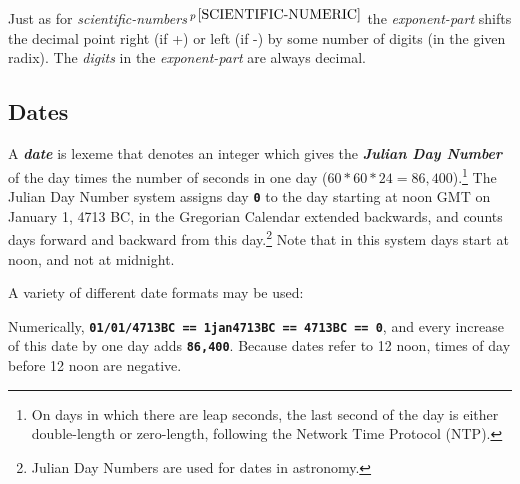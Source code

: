 \documentclass[12pt]{article}
\newcommand{\TT}[1]{{\tt \bfseries #1}}
\newcommand{\key}[1]{{\bf \em #1}\index{#1}}
\newcommand{\pagnote}[1]{$\,^{p\,\pageref{#1}}$}
\begin{document}
Just as for {\em scientific-numbers}\pagnote{SCIENTIFIC-NUMERIC}
the {\em exponent-part} shifts the decimal point right (if +) or left (if -)
by some number of digits (in the given radix).  The {\em digits}
in the {\em exponent-part} are always decimal.


\subsection{Dates}
\label{DATES}

A \key{date} is lexeme that denotes an integer
which gives the \key{Julian Day Number} of the day times
the number of seconds in one day ($60*60*24=86,400$).\footnote{
On days in which there are leap seconds, the last second of the
day is either double-length or zero-length, following the Network
Time Protocol (NTP).}
The Julian Day Number system assigns day \TT{0} to the day starting
at noon GMT on January 1, 4713 BC, in the Gregorian Calendar extended
backwards, and counts days forward and backward
from this day.\footnote{Julian Day Numbers are used for dates in astronomy.}
Note that in this system days start at noon, and not at midnight.

A variety of different date formats may be used:

Numerically, \TT{01/01/4713BC == 1jan4713BC == 4713BC == 0}, and every increase
of this date by one day adds \TT{86,400}.  Because dates refer to 12 noon,
times of day before 12 noon are negative.
\end{document}
